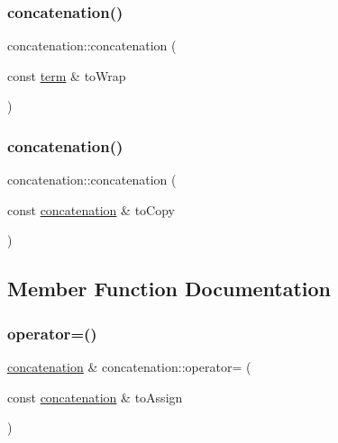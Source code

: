 \mbox{\label{classconcatenation_ad7a13dd8fb1182a5ff10b097ddb0140e}} 
\subsubsection{\texorpdfstring{concatenation()}{concatenation()}\hspace{0.1cm}{\footnotesize\ttfamily [4/5]}}
{\footnotesize\ttfamily concatenation\+::concatenation (\begin{DoxyParamCaption}\item[{const \mbox{\hyperlink{classterm}{term}} \&}]{to\+Wrap }\end{DoxyParamCaption})}

\mbox{\label{classconcatenation_ab174cf51c648af032f54ed399fa14f34}} 
\subsubsection{\texorpdfstring{concatenation()}{concatenation()}\hspace{0.1cm}{\footnotesize\ttfamily [5/5]}}
{\footnotesize\ttfamily concatenation\+::concatenation (\begin{DoxyParamCaption}\item[{const \mbox{\hyperlink{classconcatenation}{concatenation}} \&}]{to\+Copy }\end{DoxyParamCaption})\hspace{0.3cm}{\ttfamily [inline]}}



\subsection{Member Function Documentation}
\mbox{\label{classconcatenation_a6d3051ed72d4f7412cbbea509f28c8a4}} 
\subsubsection{\texorpdfstring{operator=()}{operator=()}}
{\footnotesize\ttfamily \mbox{\hyperlink{classconcatenation}{concatenation}} \& concatenation\+::operator= (\begin{DoxyParamCaption}\item[{const \mbox{\hyperlink{classconcatenation}{concatenation}} \&}]{to\+Assign }\end{DoxyParamCaption})}



